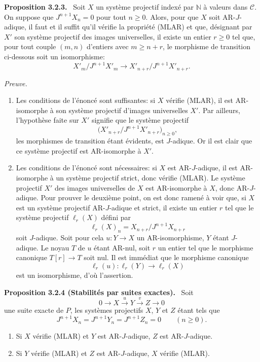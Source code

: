 \documentclass[11pt]{article}
\providecommand{\NN}{\mathbb{N}}
\newenvironment{statement}[1]{\par\medskip\noindent\textbf{#1.}\ }{\par\medskip}
\newenvironment{prooftext}[1][Proof]{\par\noindent\emph{#1.}\ }{\par\medskip}
\providecommand{\NN}{\mathbb N}
\providecommand{\cC}{\mathcal C}
\begin{document}
\begin{statement}{Proposition 3.2.3}
Soit $X$ un système projectif indexé par $\NN$ à valeurs dans $\cC$. On suppose que $J^{n+1}X_n=0$ pour tout $n\ge0$. Alors, pour que $X$ soit AR-$J$-adique, il faut et il suffit qu'il vérifie la propriété (MLAR) et que, désignant par $X'$ son système projectif des images universelles, il existe un entier $r\ge0$ tel que, pour tout couple $(m,n)$ d'entiers avec $m\ge n+r$, le morphisme de transition ci-dessous soit un isomorphisme:
\[
X'_m/J^{n+1}X'_m\longrightarrow X'_{n+r}/J^{n+1}X'_{n+r}.
\]
\end{statement}

\begin{prooftext}[Preuve]
\begin{enumerate}[label=(\alph*)]
\item Les conditions de l'énoncé sont suffisantes: si $X$ vérifie (MLAR), il est AR-isomorphe à son système projectif d'images universelles $X'$. Par ailleurs, l'hypothèse faite sur $X'$ signifie que le système projectif
\[
\bigl(X'_{n+r}/J^{n+1}X'_{n+r}\bigr)_{n\ge0},
\]
les morphismes de transition étant évidents, est $J$-adique. Or il est clair que ce système projectif est AR-isomorphe à $X'$.
\item Les conditions de l'énoncé sont nécessaires: si $X$ est AR-$J$-adique, il est AR-isomorphe à un système projectif strict, donc vérifie (MLAR). Le système projectif $X'$ des images universelles de $X$ est AR-isomorphe à $X$, donc AR-$J$-adique. Pour prouver le deuxième point, on est donc ramené à voir que, si $X$ est un système projectif AR-$J$-adique et strict, il existe un entier $r$ tel que le système projectif $\ell_r(X)$ défini par
\[
\ell_r(X)_n=X_{n+r}/J^{n+1}X_{n+r}
\]
soit $J$-adique. Soit pour cela $u:Y\to X$ un AR-isomorphisme, $Y$ étant $J$-adique. Le noyau $T$ de $u$ étant AR-nul, soit $r$ un entier tel que le morphisme canonique $T[r]\to T$ soit nul. Il est immédiat que le morphisme canonique
\[
\ell_r(u):\ell_r(Y)\longrightarrow\ell_r(X)
\]
est un isomorphisme, d'où l'assertion.
\end{enumerate}
\end{prooftext}

\begin{statement}{Proposition 3.2.4 (Stabilités par suites exactes)}
Soit
\[
0\longrightarrow X\stackrel{u}{\longrightarrow}Y\stackrel{v}{\longrightarrow}Z\longrightarrow0
\]
une suite exacte de $P$, les systèmes projectifs $X$, $Y$ et $Z$ étant tels que
\[
J^{n+1}X_n=J^{n+1}Y_n=J^{n+1}Z_n=0\qquad(n\ge0).
\]
\begin{enumerate}[label=(\roman*)]
\item Si $X$ vérifie (MLAR) et $Y$ est AR-$J$-adique, $Z$ est AR-$J$-adique.
\item Si $Y$ vérifie (MLAR) et $Z$ est AR-$J$-adique, $X$ vérifie (MLAR).
\end{enumerate}
\end{statement}
\end{document}
